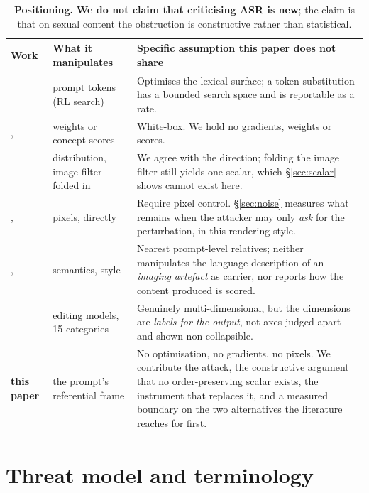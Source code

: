 \documentclass[11pt]{article}
\begin{document}
\begin{table}[t]
\centering\small
\begin{tabularx}{\textwidth}{@{}l l X@{}}
\toprule
Work & What it manipulates & Specific assumption this paper does not share \\
\midrule
\citet{sneakyprompt} & prompt tokens (RL search) & Optimises the lexical surface; a token substitution has a bounded search space and is reportable as a rate. \\
\citet{mmadiffusion}, \citet{ringabell} & weights or concept scores & White-box. We hold no gradients, weights or scores. \\
\citet{janus} & distribution, image filter folded in & We agree with the direction; folding the image filter still yields one scalar, which \S\ref{sec:scalar} shows cannot exist here. \\
\citet{universalperturb}, \citet{clipproxy} & pixels, directly & Require pixel control. \S\ref{sec:noise} measures what remains when the attacker may only \emph{ask} for the perturbation, in this rendering style. \\
\citet{aestheticcamouflage}, \citet{etch} & semantics, style & Nearest prompt-level relatives; neither manipulates the language description of an \emph{imaging artefact} as carrier, nor reports how the content produced is scored. \\
\citet{visualjailbreak} & editing models, 15 categories & Genuinely multi-dimensional, but the dimensions are \emph{labels for the output}, not axes judged apart and shown non-collapsible. \\
\midrule
\textbf{this paper} & the prompt's referential frame & No optimisation, no gradients, no pixels. We contribute the attack, the constructive argument that no order-preserving scalar exists, the instrument that replaces it, and a measured boundary on the two alternatives the literature reaches for first. \\
\bottomrule
\end{tabularx}
\caption{\textbf{Positioning.} \textbf{We do not claim that criticising ASR is
new}; the claim is that on sexual content the obstruction is constructive rather
than statistical.}
\label{tab:positioning}
\end{table}

\section{Threat model and terminology}
\label{sec:scope}
\end{document}
